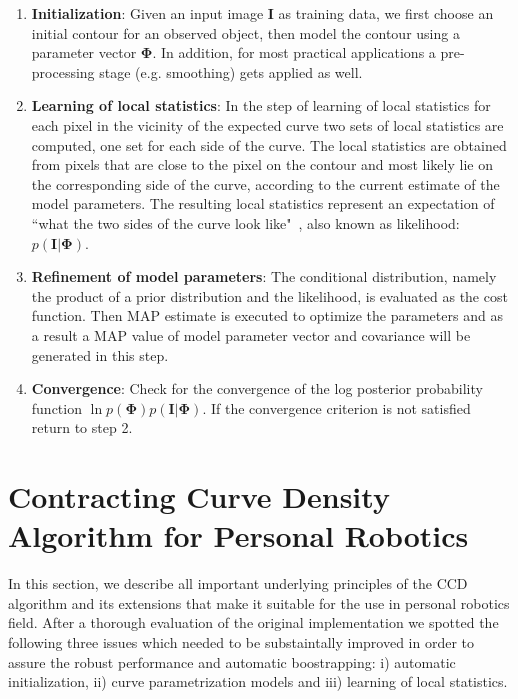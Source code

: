 \documentclass[conference]{IEEEtran}
\begin{document}
\begin{enumerate}
\item \textbf{Initialization}: Given an input image $\mathbf{I}$ as training data, we first choose an initial
  contour for an observed object, then model the contour using a
  parameter vector $\mathbf{\Phi}$. In addition, for most practical
  applications a pre-processing stage (e.g. smoothing) gets applied as well.
\item \textbf{Learning of local statistics}: 
  In the step of learning of local statistics for each pixel in the
  vicinity of the expected curve two sets of local statistics
  are computed, one set for each side of the curve. The local statistics are obtained from
  pixels that are close to the pixel on the contour and most likely lie
  on the corresponding side of the curve, according to the current
  estimate of the model parameters. The resulting local statistics
  represent an expectation of ``what the two sides of the curve look
  like"~\cite{hanek2004contracting}, also known as likelihood: $p(\mathbf{I}|\mathbf{\Phi})$.
\item \textbf{Refinement of model parameters}: The conditional distribution, namely
  the product of a prior distribution and the likelihood, is evaluated
  as the cost function. Then MAP estimate is executed to optimize the
  parameters and as a result a MAP value of model parameter vector and
  covariance will be generated in this step.
\item \textbf{Convergence}: Check for the convergence of the 
  log posterior probability function $\ln{p(\mathbf{\Phi}) p(\mathbf{I}|\mathbf{\Phi})}$. 
  If the convergence criterion is not satisfied return to step 2.
\end{enumerate}

\section{Contracting Curve Density Algorithm for Personal Robotics}
\label{sec:ccd_novelties}
In this section, we describe all important underlying principles of the CCD
algorithm and its extensions that make it suitable for the use in personal robotics field.
After a thorough evaluation of the original implementation we spotted the following three
issues which needed to be substaintally improved in order to assure the robust performance
and automatic boostrapping: i) automatic initialization, ii) curve parametrization models and
iii) learning of local statistics.
\end{document}
